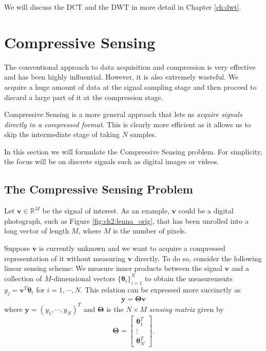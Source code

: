 We will discuss the DCT and the DWT in more detail in Chapter \ref{ch:dwt}.

\section{Compressive Sensing}
The conventional approach to data acquisition and compression is very effective and has been highly influential.
However, it is also extremely wasteful.
We acquire a huge amount of data at the signal sampling stage and then proceed to discard a large part of it at the compression stage.

Compressive Sensing \cite{candes2006,donoho2006} is a more general approach that lets us \emph{acquire signals directly in a compressed format}.
This is clearly more efficient as it allows us to skip the intermediate stage of taking $N$ samples.

In this section we will formulate the Compressive Sensing problem.
For simplicity, the focus will be on discrete signals such as digital images or videos.

\subsection{The Compressive Sensing Problem}
Let $\bm v \in\mathbb{R}^M$ be the signal of interest.
As an example, $\bm v$ could be a digital photograph, such as Figure \ref{fig:ch2:lenna_orig}, that has been unrolled into a long vector of length $M$, where $M$ is the number of pixels.

Suppose $\bm v$ is currently unknown and we want to acquire a compressed representation of it without measuring $\bm v$ directly.
To do so, consider the following linear sensing scheme:
We measure inner products between the signal $\bm v$ and a collection of $M$-dimensional vectors $\{\bm\theta_i\}_{i=1}^N$ to obtain the measurements $y_j = \bm v^T\bm\theta_i$ for $i = 1,\cdots,N$. 
This relation can be expressed more succinctly as%
\begin{equation}
\label{eqn:cs_sensing}
  \bm y = \bm\Theta\bm v
\end{equation}
where $\bm y = (y_1,\cdots,y_N)^T$ and $\bm\Theta$ is the $N\times M$ \emph{sensing matrix} given by
\begin{equation}
\label{eqn:ch2:sensor2}
  \bm\Theta = 
  \begin{bmatrix} 
    \bm \theta_1^T\\
    \vdots\\
    \bm \theta_N^T
  \end{bmatrix}.
\end{equation}

